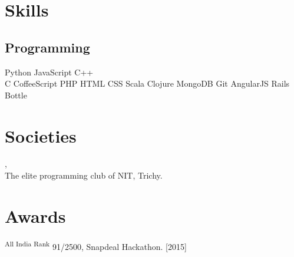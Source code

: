 \documentclass[]{deedy-resume-openfont}
\begin{document}
\begin{minipage}[t]{0.33\textwidth}

\section{Skills}
\subsection{Programming}
Python \textbullet{} JavaScript \textbullet{} C++ \\
C \textbullet{} CoffeeScript \textbullet{} PHP \textbullet{} HTML \textbullet{}  CSS \textbullet{} Scala \textbullet{} Clojure \textbullet{} MongoDB \textbullet{} Git \textbullet{} AngularJS \textbullet{} Rails \textbullet{} Bottle \textbullet{}
\sectionsep

\section{Societies} 
{\href{https://github.com/delta}{}},\\ The elite programming club of NIT, Trichy.
\sectionsep

\section{Awards} 
\textsuperscript{All India Rank} 91/2500, Snapdeal Hackathon. [2015]\\
\sectionsep

%
%

\end{minipage} 
\hfill
\end{document}
